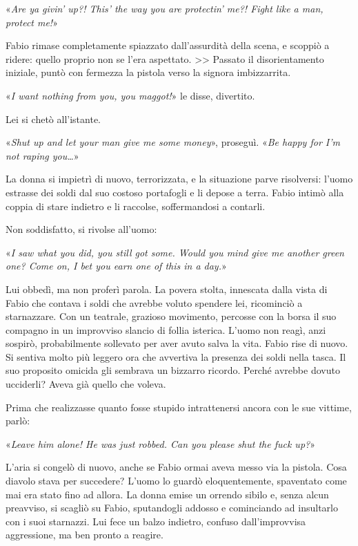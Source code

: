 «\textit{Are ya givin' up?! This' the way you are protectin' me?! Fight like a man, protect me!}»

Fabio rimase completamente spiazzato dall'assurdità della scena, e scoppiò a ridere: quello proprio non se l'era aspettato. 
>>
Passato il disorientamento iniziale, puntò con fermezza la pistola verso la signora imbizzarrita.

«\textit{I want nothing from you, you maggot!}» le disse, divertito.

Lei si chetò all'istante.

«\textit{Shut up and let your man give me some money}», proseguì. «\textit{Be happy for I'm not raping you\ldots}»

La donna si impietrì di nuovo, terrorizzata, e la situazione parve risolversi: l'uomo estrasse dei soldi dal suo costoso portafogli e li depose a terra. Fabio intimò alla coppia di stare indietro e li raccolse, soffermandosi a contarli.

Non soddisfatto, si rivolse all'uomo:

«\textit{I saw what you did, you still got some. Would you mind give me another green one? Come on, I bet you earn one of this in a day.}»

Lui obbedì, ma non proferì parola. La povera stolta, innescata dalla vista di Fabio che contava i soldi che avrebbe voluto spendere lei, ricominciò a starnazzare. Con un teatrale, grazioso movimento, percosse con la borsa il suo compagno in un improvviso slancio di follia isterica. L'uomo non reagì, anzi sospirò, probabilmente sollevato per aver avuto salva la vita. Fabio rise di nuovo. Si sentiva molto più leggero ora che avvertiva la presenza dei soldi nella tasca. Il suo proposito omicida gli sembrava un bizzarro ricordo. Perché avrebbe dovuto ucciderli? Aveva già quello che voleva.

Prima che realizzasse quanto fosse stupido intrattenersi ancora con le sue vittime, parlò:

«\textit{Leave him alone! He was just robbed. Can you please shut the fuck up?}»

L'aria si congelò di nuovo, anche se Fabio ormai aveva messo via la pistola. Cosa diavolo stava per succedere? L'uomo lo guardò eloquentemente, spaventato come mai era stato fino ad allora. La donna emise un orrendo sibilo e, senza alcun preavviso, si scagliò su Fabio, sputandogli addosso e cominciando ad insultarlo con i suoi starnazzi. Lui fece un balzo indietro, confuso dall'improvvisa aggressione, ma ben pronto a reagire.

